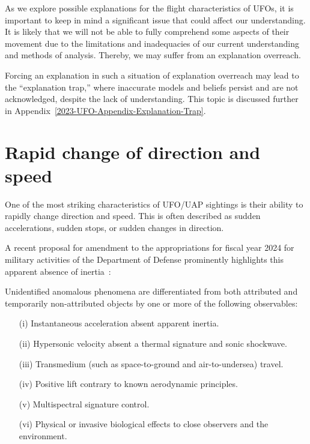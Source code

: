 As we explore possible explanations for the flight characteristics of UFOs, it is important to keep in mind a significant issue that could affect our understanding. It is likely that we will not be able to fully comprehend some aspects of their movement due to the limitations and inadequacies of our current understanding and methods of analysis.
Thereby, we may suffer from an explanation overreach.

Forcing an explanation in such a situation of explanation overreach may lead to the ``explanation trap,''
where inaccurate models and beliefs persist and are not acknowledged, despite the lack of understanding.
This topic is discussed further in Appendix~\ref{2023-UFO-Appendix-Explanation-Trap}.

\section{Rapid change of direction and speed}
\label{2023-UFO-part-Perception-flight-characteristics-rcds}

One of the most striking characteristics of UFO/UAP sightings is their ability
to rapidly change direction and speed. This is often described as sudden accelerations, sudden stops,
or sudden changes in direction.

A recent proposal for amendment to the appropriations for fiscal year 2024 for military activities
of the Department of Defense
prominently highlights this apparent absence of inertia~\cite{PropAment2024AFY}:

\begin{svgraybox}
Unidentified anomalous phenomena are differentiated from both attributed and temporarily non-attributed objects by one or more of the following observables:
\begin{enumerate}
\item[(i)] Instantaneous acceleration absent apparent inertia.

\item[(ii)] Hypersonic velocity absent a thermal signature and sonic shockwave.

\item[(iii)] Transmedium (such as space-to-ground and air-to-undersea) travel.

\item[(iv)] Positive lift contrary to known  aerodynamic principles.

\item[(v)] Multispectral signature control.

\item[(vi)] Physical or invasive biological effects to close observers and the environment.
\end{enumerate}
\end{svgraybox}


